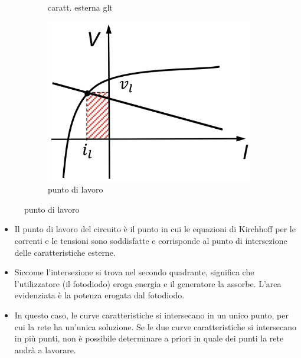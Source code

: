 \documentclass[a4paper]{article}
\begin{document}
\begin{figure}[h]
\begin{minipage}{0.2\textwidth}
\begin{subfigure}[h]{0.8\textwidth}
			\caption*{caratt. esterna glt}
		\end{subfigure}
	\end{minipage}
	\begin{minipage}{0.2\textwidth}
		\begin{subfigure}[h]{0.9\textwidth}
			\includegraphics[width=\textwidth]{puntodilavoro.png}
			\caption*{punto di lavoro}
		\end{subfigure}
	\end{minipage}
\end{figure}
\begin{itemize}
	\item Il punto di lavoro del circuito è il punto in cui le equazioni di Kirchhoff per le correnti e le tensioni sono
	soddisfatte e corrisponde al punto di intersezione delle caratteristiche esterne.
	\item Siccome l'intersezione si trova nel secondo quadrante, significa che l'utilizzatore (il fotodiodo) eroga energia
	e il generatore la assorbe. L'area evidenziata è la potenza erogata dal fotodiodo.
	\item In questo caso, le curve caratteristiche si intersecano in un unico punto, per cui la rete ha un'unica soluzione.
	Se le due curve caratteristiche si intersecano in più punti, non è possibile determinare a priori in quale dei punti
	la rete andrà a lavorare.
\end{itemize}
\end{document}
